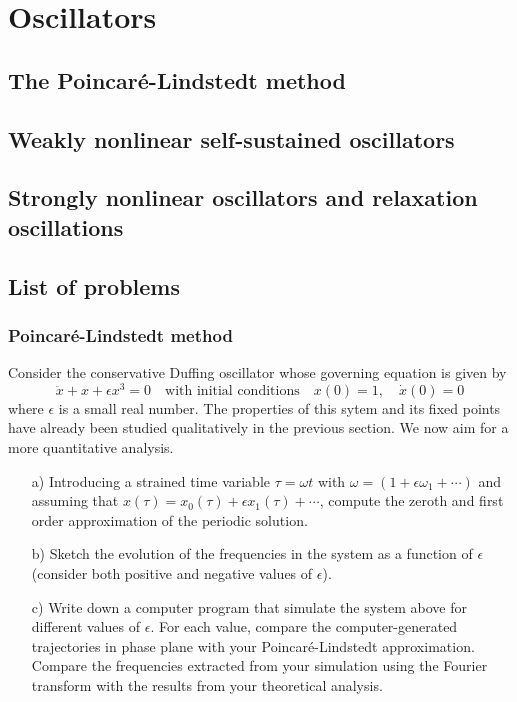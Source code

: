 \section{Oscillators}

\subsection{The Poincaré-Lindstedt method}

\subsection{Weakly nonlinear self-sustained oscillators}

\subsection{Strongly nonlinear oscillators and relaxation oscillations}

\subsection{List of problems}

\subsubsection*{Poincaré-Lindstedt method}

\begin{problem}
  Consider the conservative Duffing oscillator whose governing equation is given by
  \[
  \ddot{x} + x + \epsilon x^3 = 0 \quad \text{with initial conditions} \quad x(0) = 1, \quad \dot{x}(0) = 0
  \]
  where $\epsilon$ is a small real number.
  The properties of this sytem and its fixed points have already been studied qualitatively in the previous section.
  We now aim for a more quantitative analysis.

  \bigskip

  \begin{enumerate}
  \item[a)] Introducing a strained time variable $\tau = \omega t$ with $\omega = \left( 1 + \epsilon \omega_1 + \cdots\right)$ and assuming that $x(\tau) = x_0(\tau) + \epsilon x_1(\tau) + \cdots$, compute the zeroth and first order approximation of the periodic solution.

  \item[b)] Sketch the evolution of the frequencies in the system as a function of $\epsilon$ (consider both positive and negative values of $\epsilon$).

  \item[c)] Write down a computer program that simulate the system above for different values of $\epsilon$.
    For each value, compare the computer-generated trajectories in phase plane with your Poincaré-Lindstedt approximation.
    Compare the frequencies extracted from your simulation using the Fourier transform with the results from your theoretical analysis.
  \end{enumerate}
  
\end{problem}

